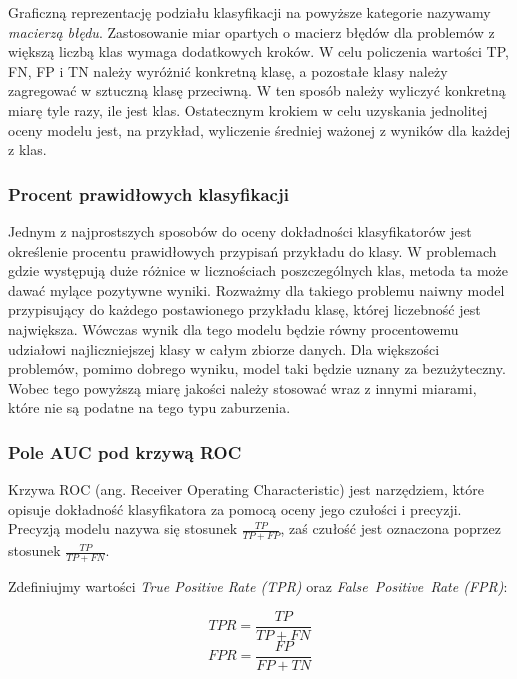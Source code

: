 \documentclass[a4paper, twoside, 11pt, openright]{article}
\begin{document}
Graficzną reprezentację podziału klasyfikacji na powyższe kategorie nazywamy \textit{macierzą błędu}. Zastosowanie miar opartych o macierz błędów dla problemów z większą liczbą klas wymaga dodatkowych kroków. W celu policzenia wartości TP, FN, FP i TN należy wyróżnić konkretną klasę, a pozostałe klasy należy zagregować w sztuczną klasę przeciwną. W ten sposób należy wyliczyć konkretną miarę tyle razy, ile jest klas. Ostatecznym krokiem w celu uzyskania jednolitej oceny modelu jest, na przykład, wyliczenie średniej ważonej z wyników dla każdej z klas.


\subsubsection{Procent prawidłowych klasyfikacji}

Jednym z najprostszych sposobów do oceny dokładności klasyfikatorów jest określenie procentu prawidłowych przypisań przykładu do klasy. W problemach gdzie występują duże różnice w licznościach poszczególnych klas, metoda ta może dawać mylące pozytywne wyniki. Rozważmy dla takiego problemu naiwny model przypisujący do każdego postawionego przykładu klasę, której liczebność jest największa. Wówczas wynik dla tego modelu będzie równy procentowemu udziałowi najliczniejszej klasy w całym zbiorze danych. Dla większości problemów, pomimo dobrego wyniku, model taki będzie uznany za bezużyteczny. Wobec tego powyższą miarę jakości należy stosować wraz z innymi miarami, które nie są podatne na tego typu zaburzenia.

\subsubsection{Pole AUC pod krzywą ROC}

Krzywa ROC (ang. Receiver Operating Characteristic) \cite{roc} jest narzędziem, które opisuje dokładność klasyfikatora za pomocą oceny jego czułości i precyzji. Precyzją modelu nazywa się stosunek $\frac{TP}{TP+FP}$, zaś czułość jest oznaczona poprzez stosunek $\frac{TP}{TP+FN}$.

\bigskip

Zdefiniujmy wartości \textit{True Positive Rate (TPR)} oraz \textit{False\ Positive\ Rate (FPR)}:


\begin{equation}
TPR = \frac{TP}{TP+FN}
\end{equation}
\begin{equation}
FPR = \frac{FP}{FP+TN}
\end{equation}
\end{document}
